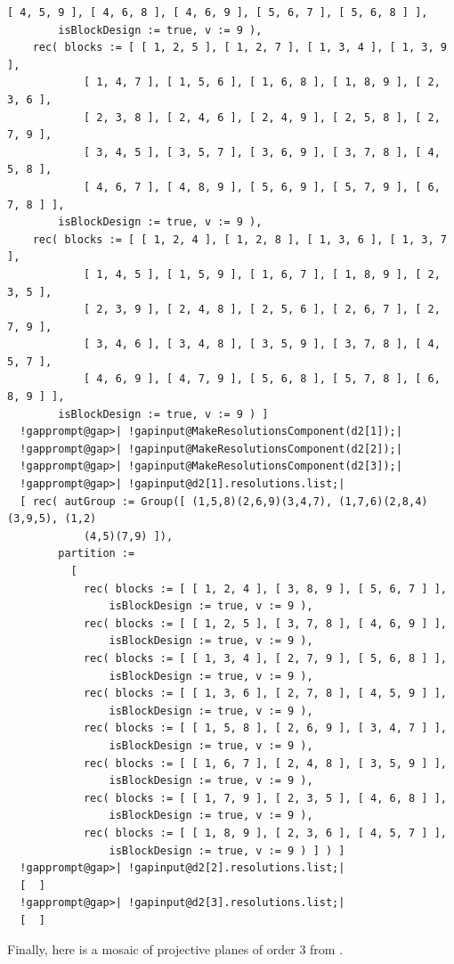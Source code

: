 \documentclass[a4paper,11pt]{report}
\begin{document}
{{\begin{Verbatim}[commandchars=!@|,fontsize=\small,frame=single,label=Example]
            [ 4, 5, 9 ], [ 4, 6, 8 ], [ 4, 6, 9 ], [ 5, 6, 7 ], [ 5, 6, 8 ] ], 
        isBlockDesign := true, v := 9 ), 
    rec( blocks := [ [ 1, 2, 5 ], [ 1, 2, 7 ], [ 1, 3, 4 ], [ 1, 3, 9 ], 
            [ 1, 4, 7 ], [ 1, 5, 6 ], [ 1, 6, 8 ], [ 1, 8, 9 ], [ 2, 3, 6 ], 
            [ 2, 3, 8 ], [ 2, 4, 6 ], [ 2, 4, 9 ], [ 2, 5, 8 ], [ 2, 7, 9 ], 
            [ 3, 4, 5 ], [ 3, 5, 7 ], [ 3, 6, 9 ], [ 3, 7, 8 ], [ 4, 5, 8 ], 
            [ 4, 6, 7 ], [ 4, 8, 9 ], [ 5, 6, 9 ], [ 5, 7, 9 ], [ 6, 7, 8 ] ], 
        isBlockDesign := true, v := 9 ), 
    rec( blocks := [ [ 1, 2, 4 ], [ 1, 2, 8 ], [ 1, 3, 6 ], [ 1, 3, 7 ], 
            [ 1, 4, 5 ], [ 1, 5, 9 ], [ 1, 6, 7 ], [ 1, 8, 9 ], [ 2, 3, 5 ], 
            [ 2, 3, 9 ], [ 2, 4, 8 ], [ 2, 5, 6 ], [ 2, 6, 7 ], [ 2, 7, 9 ], 
            [ 3, 4, 6 ], [ 3, 4, 8 ], [ 3, 5, 9 ], [ 3, 7, 8 ], [ 4, 5, 7 ], 
            [ 4, 6, 9 ], [ 4, 7, 9 ], [ 5, 6, 8 ], [ 5, 7, 8 ], [ 6, 8, 9 ] ], 
        isBlockDesign := true, v := 9 ) ]
  !gapprompt@gap>| !gapinput@MakeResolutionsComponent(d2[1]);|
  !gapprompt@gap>| !gapinput@MakeResolutionsComponent(d2[2]);|
  !gapprompt@gap>| !gapinput@MakeResolutionsComponent(d2[3]);|
  !gapprompt@gap>| !gapinput@d2[1].resolutions.list;|
  [ rec( autGroup := Group([ (1,5,8)(2,6,9)(3,4,7), (1,7,6)(2,8,4)(3,9,5), (1,2)
            (4,5)(7,9) ]), 
        partition := 
          [ 
            rec( blocks := [ [ 1, 2, 4 ], [ 3, 8, 9 ], [ 5, 6, 7 ] ], 
                isBlockDesign := true, v := 9 ), 
            rec( blocks := [ [ 1, 2, 5 ], [ 3, 7, 8 ], [ 4, 6, 9 ] ], 
                isBlockDesign := true, v := 9 ), 
            rec( blocks := [ [ 1, 3, 4 ], [ 2, 7, 9 ], [ 5, 6, 8 ] ], 
                isBlockDesign := true, v := 9 ), 
            rec( blocks := [ [ 1, 3, 6 ], [ 2, 7, 8 ], [ 4, 5, 9 ] ], 
                isBlockDesign := true, v := 9 ), 
            rec( blocks := [ [ 1, 5, 8 ], [ 2, 6, 9 ], [ 3, 4, 7 ] ], 
                isBlockDesign := true, v := 9 ), 
            rec( blocks := [ [ 1, 6, 7 ], [ 2, 4, 8 ], [ 3, 5, 9 ] ], 
                isBlockDesign := true, v := 9 ), 
            rec( blocks := [ [ 1, 7, 9 ], [ 2, 3, 5 ], [ 4, 6, 8 ] ], 
                isBlockDesign := true, v := 9 ), 
            rec( blocks := [ [ 1, 8, 9 ], [ 2, 3, 6 ], [ 4, 5, 7 ] ], 
                isBlockDesign := true, v := 9 ) ] ) ]
  !gapprompt@gap>| !gapinput@d2[2].resolutions.list;|
  [  ]
  !gapprompt@gap>| !gapinput@d2[3].resolutions.list;|
  [  ]
\end{Verbatim}
 Finally, here is a mosaic of projective planes of order $3$ from \cite{VK24}. 
\begin{Verbatim}[commandchars=!@|,fontsize=\small,frame=single,label=Example]

\end{Verbatim}}}
\end{document}
